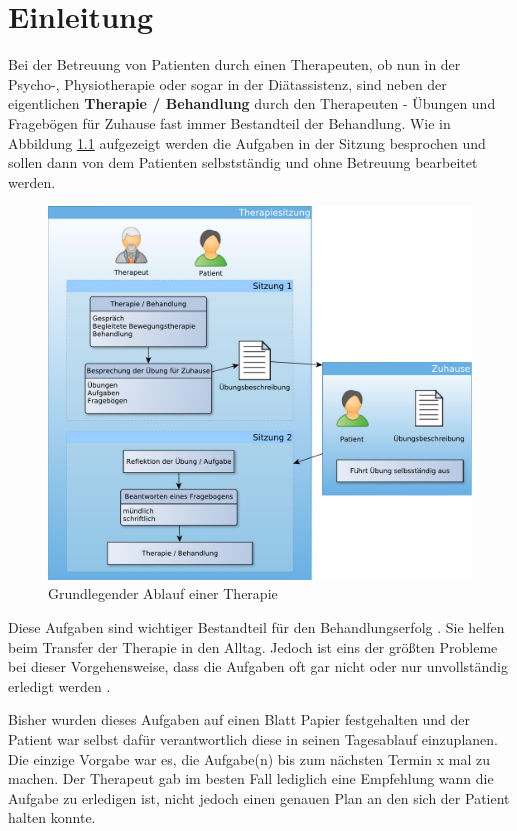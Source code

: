 \chapter{Einleitung}
Bei der Betreuung von Patienten durch einen Therapeuten, ob nun in der Psycho-, Physiotherapie oder sogar in der Diätassistenz, sind neben der eigentlichen \textbf{Therapie / Behandlung} durch den Therapeuten - Übungen und Fragebögen für Zuhause fast immer Bestandteil der Behandlung. Wie in Abbildung \ref{TherapieAblauf} aufgezeigt werden die Aufgaben in der Sitzung besprochen und sollen dann von dem Patienten selbstständig und ohne Betreuung bearbeitet werden.

\begin{figure}[H]
	\centering
	\includegraphics[scale=0.55]{images/TherapieAblauf}
	\caption[Grundlegender Ablauf einer Therapie]{Grundlegender Ablauf einer Therapie}
	\label{TherapieAblauf}
\end{figure}

Diese Aufgaben sind wichtiger Bestandteil für den Behandlungserfolg \cite{SL05}. Sie helfen beim Transfer der Therapie in den Alltag. Jedoch ist eins der größten Probleme bei dieser Vorgehensweise, dass die Aufgaben oft gar nicht oder nur unvollständig erledigt werden \cite{FF01}.

Bisher wurden dieses Aufgaben auf einen Blatt Papier festgehalten und der Patient war selbst dafür verantwortlich diese in seinen Tagesablauf einzuplanen. Die einzige Vorgabe war es, die Aufgabe(n) bis zum nächsten Termin x mal zu machen. Der Therapeut gab im besten Fall lediglich eine Empfehlung wann die Aufgabe zu erledigen ist, nicht jedoch einen genauen Plan an den sich der Patient halten konnte.
